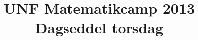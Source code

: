 \documentclass[article,10pt,oneside]{article}
\begin{document}
\title{UNF Matematikcamp 2013 \\ Dagseddel torsdag}

\begin{minipage}[t]{410mm}
\begin{minipage}[t]{200mm}

\end{minipage}%
\hspace{10mm}\begin{minipage}[t]{200mm}

\end{minipage}
\end{minipage}

\newpage

\begin{minipage}[t]{410mm}

\end{minipage}
\end{document}
